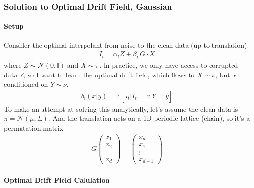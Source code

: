 \documentclass[12pt,fleqn]{article}
\numberwithin{equation}{section}
\begin{document}
\subsubsection{Solution to Optimal Drift Field, Gaussian}
\paragraph{Setup}
Consider the optimal interpolant from noise to the clean data (up to translation)
\begin{align}
	I_t = \alpha_t Z + \beta_t \, G\cdot X \label{eqn:mra_interpolant}
\end{align}
where $Z \sim \mathcal N(0, \mathbb I)$ and $X \sim \pi$. In practice, we only have access to corrupted data $Y$, so I want to learn the optimal drift field, which flows to $X \sim \pi$, but is conditioned on $Y \sim \nu$.
\begin{align}
	b_t(x|y) = \mathbb E[\dot I_t | I_t=x | Y=y]
\end{align}
To make an attempt at solving this analytically, let's assume the clean data is $\pi = \mathcal N(\mu, \Sigma)$. And the translation acts on a 1D periodic lattice (chain), so it's a permutation matrix
\begin{align}
	G \begin{pmatrix}
		x_1 \\ x_2 \\ \vdots \\ x_d
	\end{pmatrix} = \begin{pmatrix}
		x_d \\
		x_1 \\ 
		\vdots \\
		x_{d-1}
	\end{pmatrix}
\end{align}
\paragraph{Optimal Drift Field Calulation}
\end{document}
